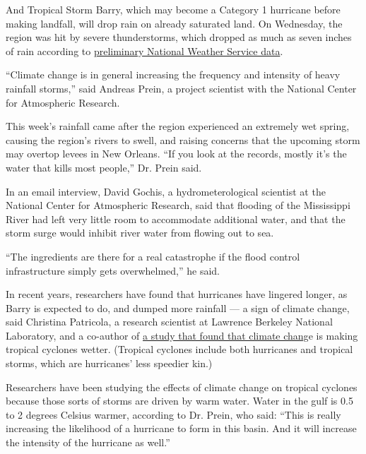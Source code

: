 And Tropical Storm Barry, which may become a Category 1 hurricane before
making landfall, will drop rain on already saturated land. On Wednesday,
the region was hit by severe thunderstorms, which dropped as much as
seven inches of rain according to
\href{https://w2.weather.gov/climate/getclimate.php?date=\&wfo=lix\&sid=LA\&pil=RTPxx\&recent=yes\&specdate=2019-07-11+00\%3A34\%3A52}{preliminary
National Weather Service data}.

``Climate change is in general increasing the frequency and intensity of
heavy rainfall storms,'' said Andreas Prein, a project scientist with
the National Center for Atmospheric Research.

This week's rainfall came after the region experienced an extremely wet
spring, causing the region's rivers to swell, and raising concerns that
the upcoming storm may overtop levees in New Orleans. ``If you look at
the records, mostly it's the water that kills most people,'' Dr. Prein
said.

In an email interview, David Gochis, a hydrometerological scientist at
the National Center for Atmospheric Research, said that flooding of the
Mississippi River had left very little room to accommodate additional
water, and that the storm surge would inhibit river water from flowing
out to sea.

``The ingredients are there for a real catastrophe if the flood control
infrastructure simply gets overwhelmed,'' he said.

In recent years, researchers have found that hurricanes have lingered
longer, as Barry is expected to do, and dumped more rainfall --- a sign
of climate change, said Christina Patricola, a research scientist at
Lawrence Berkeley National Laboratory, and a co-author of
\href{https://www.nature.com/articles/s41586-018-0673-2}{a study that
found that climate chang}e is making tropical cyclones wetter. (Tropical
cyclones include both hurricanes and tropical storms, which are
hurricanes' less speedier kin.)

Researchers have been studying the effects of climate change on tropical
cyclones because those sorts of storms are driven by warm water. Water
in the gulf is 0.5 to 2 degrees Celsius warmer, according to Dr. Prein,
who said: ``This is really increasing the likelihood of a hurricane to
form in this basin. And it will increase the intensity of the hurricane
as well.''

\href{https://www.nytimes3xbfgragh.onion/section/climate?action=click\&pgtype=Article\&state=default\&region=MAIN_CONTENT_1\&context=storylines_keepup}{}

